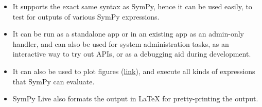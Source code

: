 \begin{itemize}
\item
  It supports the exact same syntax as SymPy, hence it can be used
  easily, to test for outputs of various SymPy expressions.
\item
  It can be run as a standalone app or in an existing app as an
  admin-only handler, and can also be used for system administration
  tasks, as an interactive way to try out APIs, or as a debugging aid
  during development.
\item
  It can also be used to plot figures (\href{http://live.sympy.org/?evaluate=from\%20sympy\%20import\%20symbols\%0Afrom\%20sympy.plotting\%20import\%20textplot\%0Ax\%20\%3D\%20symbols(\%27x\%27)\%0Atextplot(x**2\%2C0\%2C5)\%0A\%23--\%0A}{link}), 
  and execute all kinds of expressions that SymPy can evaluate.
\item
SymPy Live also formats the output in LaTeX for pretty-printing the
output.
\end{itemize}